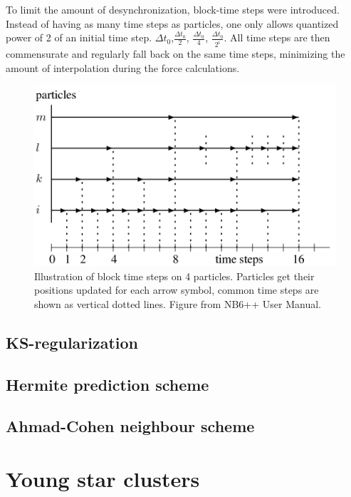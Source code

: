  To limit the amount of desynchronization, block-time steps were introduced. Instead of having as many time steps as particles, one only allows quantized power of 2 of an initial time step. $\Delta t_0$,$\frac{\Delta t_0}{2}$, $\frac{\Delta t_0}{4}$, $\frac{\Delta t_0}{2^i}$. All time steps are then commensurate and regularly fall back on the same time steps, minimizing the amount of interpolation during the force calculations.
 
\begin{figure}
\label{Fig:blocktimesteps}
\center
\includegraphics[width=0.6\linewidth]{Figures/0_block_timesteps.png}
\caption{Illustration of block time steps on 4 particles. Particles get their positions updated for each arrow symbol, common time steps are shown as vertical dotted lines. Figure from NB6++ User Manual. }
\end{figure} 
 
 
\subsection{KS-regularization}

\subsection{Hermite prediction scheme}

\subsection{Ahmad-Cohen neighbour scheme}




\newpage
 \section{Young star clusters}











